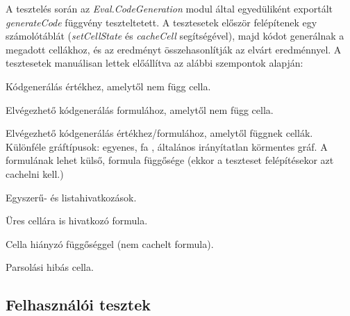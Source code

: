 A tesztelés során az \textit{Eval.CodeGeneration} modul által egyedüliként exportált \textit{generateCode} függvény teszteltetett. A tesztesetek először felépítenek egy számolótáblát (\textit{setCellState} és \textit{cacheCell} segítségével), majd kódot generálnak a megadott cellákhoz, és az eredményt összehasonlítják az elvárt eredménnyel. A tesztesetek manuálisan lettek előállítva az alábbi szempontok alapján: 

\begin{compactenum}
	\item Kódgenerálás értékhez, amelytől nem függ cella.
	\item Elvégezhető kódgenerálás formulához, amelytől nem függ cella.
	\item Elvégezhető kódgenerálás értékhez/formulához, amelytől függnek cellák. Különféle gráftípusok: egyenes, fa	, általános irányítatlan körmentes gráf. A formulának lehet külső, formula függősége (ekkor a teszteset felépítésekor azt cachelni kell.)
	\item Egyszerű- és listahivatkozások.
	\item Üres cellára is hivatkozó formula.
	\item Cella hiányzó függőséggel (nem cachelt formula).
	\item Parsolási hibás cella.
\end{compactenum}

\subsection{Felhasználói tesztek}

